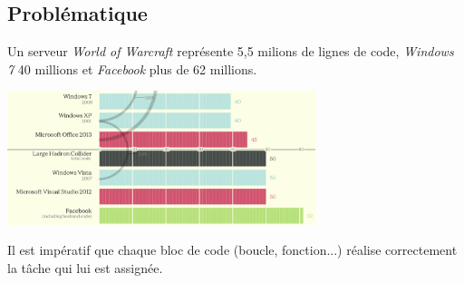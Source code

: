 \documentclass[a4paper,11pt]{article}
\begin{document}
\begin{Form}
\section{Problématique}
Un serveur \emph{World of Warcraft} représente 5,5 milions de lignes de code, \emph{Windows 7} 40 millions et \emph{Facebook} plus de 62 millions.
\begin{center}
\centering
\includegraphics[width=9cm]{ressources/nb-lignes.png}
\label{nblignes}
\end{center}
Il est impératif que chaque bloc de code (boucle, fonction...) réalise correctement la tâche qui lui est assignée.
\begin{center}
\end{center}

\end{Form}
\end{document}
